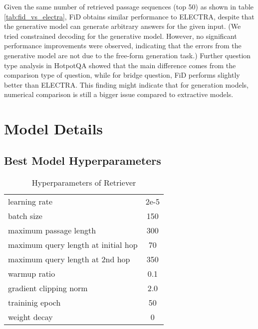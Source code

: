  
Given the same number of retrieved passage sequences (top 50) as shown in table \ref{tab:fid_vs_electra}, FiD obtains similar performance to ELECTRA, despite that the generative model can generate arbitrary answers for the given input. (We tried constrained decoding for the generative model. However, no significant performance improvements were observed, indicating that the errors from the generative model are not due to the free-form generation task.) Further question type analysis in HotpotQA showed that the main difference comes from the comparison type of question, while for bridge question, FiD performs slightly better than ELECTRA. This finding might indicate that for generation models, numerical comparison is still a bigger issue compared to extractive models.

\section{Model Details}

\subsection{Best Model Hyperparameters}
\label{appendix:hyperparameter}
\begin{table}[h]
    \centering
    \caption{Hyperparameters of Retriever}
    \begin{tabular}{lc}
    \toprule
        learning rate & 2e-5\\
        batch size & 150 \\
        maximum passage length & 300 \\
        maximum query length at initial hop & 70 \\
        maximum query length at 2nd hop & 350 \\
        warmup ratio & 0.1 \\
        gradient clipping norm & 2.0 \\
        traininig epoch & 50 \\
        weight decay & 0 \\
    \bottomrule
    \end{tabular}
    \label{tab:my_label}
\end{table}

